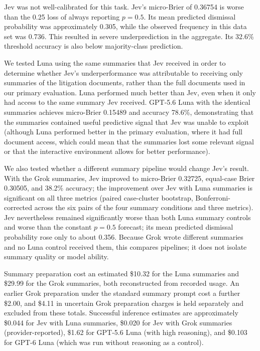 \documentclass[11pt]{article}
\begin{document}
Jev was not well-calibrated for this task. Jev's micro-Brier of 0.36754 is worse than the 0.25 loss of always reporting $p=0.5$. Its mean predicted dismissal probability was approximately 0.305, while the observed frequency in this data set was 0.736. This resulted in severe underprediction in the aggregate. Its 32.6\% threshold accuracy is also below majority-class prediction.

We tested Luna using the same summaries that Jev received in order to determine whether Jev's underperformance was attributable to receiving only summaries of the litigation documents, rather than the full documents used in our primary evaluation. Luna performed much better than Jev, even when it only had access to the same summary Jev received. GPT-5.6 Luna with the identical summaries achieves micro-Brier 0.15489 and accuracy 78.6\%, demonstrating that the summaries contained useful predictive signal that Jev was unable to exploit (although Luna performed better in the primary evaluation, where it had full document access, which could mean that the summaries lost some relevant signal or that the interactive environment allows for better performance).

We also tested whether a different summary pipeline would change Jev's result. With the Grok summaries, Jev improved to micro-Brier 0.32725, equal-case Brier 0.30505, and 38.2\% accuracy; the improvement over Jev with Luna summaries is significant on all three metrics (paired case-cluster bootstrap, Bonferroni-corrected across the six pairs of the four summary conditions and three metrics). Jev nevertheless remained significantly worse than both Luna summary controls and worse than the constant $p=0.5$ forecast; its mean predicted dismissal probability rose only to about 0.356. Because Grok wrote different summaries and no Luna control received them, this compares pipelines; it does not isolate summary quality or model ability.

Summary preparation cost an estimated \$10.32 for the Luna summaries and \$29.99 for the Grok summaries, both reconstructed from recorded usage. An earlier Grok preparation under the standard summary prompt cost a further \$2.00, and \$4.11 in uncertain Grok preparation charges is held separately and excluded from these totals. Successful inference estimates are approximately \$0.044 for Jev with Luna summaries, \$0.020 for Jev with Grok summaries (provider-reported), \$1.62 for GPT-5.6 Luna (with high reasoning), and \$0.103 for GPT-6 Luna (which was run without reasoning as a control).
\end{document}
